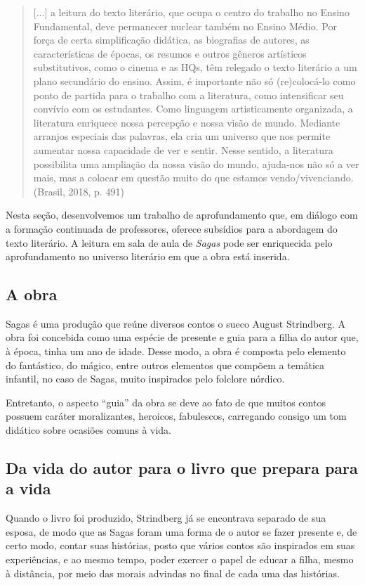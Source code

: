 \documentclass[12pt]{extarticle}
\begin{document}
\begin{quote}
{[}...{]} a leitura do texto literário, que ocupa o centro do trabalho
no Ensino Fundamental, deve permanecer nuclear também no Ensino Médio.
Por força de certa simplificação didática, as biografias de autores, as
características de épocas, os resumos e outros gêneros artísticos
substitutivos, como o cinema e as HQs, têm relegado o texto literário a
um plano secundário do ensino. Assim, é importante não só (re)colocá-lo
como ponto de partida para o trabalho com a literatura, como
intensificar seu convívio com os estudantes. Como linguagem
artisticamente organizada, a literatura enriquece nossa percepção e
nossa visão de mundo. Mediante arranjos especiais das palavras, ela cria
um universo que nos permite aumentar nossa capacidade de ver e sentir.
Nesse sentido, a literatura possibilita uma ampliação da nossa visão do
mundo, ajuda-nos não só a ver mais, mas a colocar em questão muito do
que estamos vendo/vivenciando. (Brasil, 2018, p. 491)
\end{quote}

Nesta seção, desenvolvemos um trabalho de aprofundamento que, em diálogo
com a formação continuada de professores, oferece subsídios para a
abordagem do texto literário. A leitura em sala de aula de \emph{Sagas}
pode ser enriquecida pelo aprofundamento no universo literário em que a
obra está inserida.

\subsection{A obra}

Sagas é uma produção que reúne diversos contos o sueco August
Strindberg. A obra foi concebida como uma espécie de presente e guia
para a filha do autor que, à época, tinha um ano de idade. Desse modo, a
obra é composta pelo elemento do fantástico, do mágico, entre outros
elementos que compõem a temática infantil, no caso de Sagas, muito
inspirados pelo folclore nórdico.

Entretanto, o aspecto ``guia'' da obra se deve ao fato de que muitos
contos possuem caráter moralizantes, heroicos, fabulescos, carregando
consigo um tom didático sobre ocasiões comuns à vida.

\subsection{Da vida do autor para o livro que prepara para a vida}

Quando o livro foi produzido, Strindberg já se encontrava separado de
sua esposa, de modo que as Sagas foram uma forma de o autor se fazer
presente e, de certo modo, contar suas histórias, posto que vários
contos são inspirados em suas experiências, e ao mesmo tempo, poder
exercer o papel de educar a filha, mesmo à distância, por meio das
morais advindas no final de cada uma das histórias.
\end{document}
